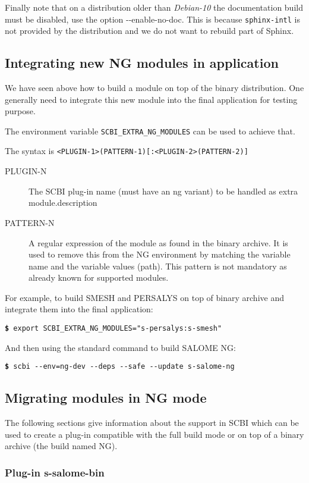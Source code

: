 \documentclass[a4paper,12pt,twoside]{article}
\newcommand{\code}[1]{\texttt{#1}}
\renewcommand{\emph}[1]{\textit{#1}}
\newcommand{\cmd}[1]{\tabto{1cm}\hspace{0.5cm}\texttt{\textbf{\$} #1}}
\newcommand{\ddash}{-{}-}
\begin{document}
Finally note that on a distribution older than \emph{Debian-10} the documentation build must be disabled, use the option \ddash{}enable-no-doc. This is because \code{sphinx-intl} is not provided by the distribution and we do not want to rebuild part of Sphinx.

\subsection{Integrating new NG modules in application}

We have seen above how to build a module on top of the binary distribution. One generally need to integrate this new module into the final application for testing purpose.

The environment variable \code{SCBI\_EXTRA\_NG\_MODULES} can be used to achieve that.

The syntax is \code{<PLUGIN-1>(PATTERN-1)[:<PLUGIN-2>(PATTERN-2)]}

\begin{description}
	\item[PLUGIN-N] The SCBI plug-in name (must have an ng variant) to be handled as extra module.description
	\item[PATTERN-N] A regular expression of the module as found in the binary archive. It is used to remove this from the NG environment by matching the variable name and the variable values (path). This pattern is not mandatory as already known for supported modules.
\end{description}

For example, to build SMESH and PERSALYS on top of binary archive and integrate them into the final application:

\cmd{export SCBI\_EXTRA\_NG\_MODULES="s-persalys:s-smesh"}

And then using the standard command to build SALOME NG:

\cmd{scbi \ddash{}env=ng-dev \ddash{}deps \ddash{}safe \ddash{}update s-salome-ng}

\subsection{Migrating modules in NG mode}
\label{migrateng}

The following sections give information about the support in SCBI which can be used to create a plug-in compatible with the full build mode or on top of a binary archive (the build named NG).

\subsubsection{Plug-in s-salome-bin}
\label{pg:salbin}
\end{document}
